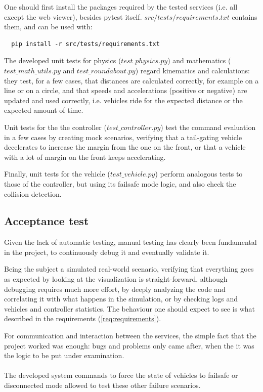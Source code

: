 One should first install the packages required by the tested services (i.e. all
except the web viewer), besides pytest itself. $src/tests/requirements.txt$
contains them, and can be used with:
\begin{verbatim}
  pip install -r src/tests/requirements.txt
\end{verbatim}

The developed unit tests for physics ($test\_physics.py$) and mathematics
($test\_math\_utils.py$ and $test\_roundabout.py$) regard kinematics and
calculations: they test, for a few cases, that distances are calculated
correctly, for example on a line or on a circle, and that speeds and
accelerations (positive or negative) are updated and used correctly, i.e.
vehicles ride for the expected distance or the expected amount of time.

Unit tests for the the controller ($test\_controller.py$) test the command
evaluation in a few cases by creating mock scenarios, verifying that a
tail-gating vehicle decelerates to increase the margin from the one on the
front, or that a vehicle with a lot of margin on the front keeps accelerating.

Finally, unit tests for the vehicle ($test\_vehicle.py$) perform analogous tests
to those of the controller, but using its failsafe mode logic, and also check
the collision detection.

\subsection{Acceptance test}\label{validation-acceptance}

Given the lack of automatic testing, manual testing has clearly been fundamental
in the project, to continuously debug it and eventually validate it.

Being the subject a simulated real-world scenario, verifying that everything
goes as expected by looking at the visualization is straight-forward, although
debugging requires much more effort, by deeply analyzing the code and
correlating it with what happens in the simulation, or by checking logs and
vehicles and controller statistics. The behaviour one should expect to see is
what described in the requirements (\ref{req:requirements}).

For communication and interaction between the services, the simple fact that the
project worked was enough: bugs and problems only came after, when the it was
the logic to be put under examination.
\\
\\
The developed system commands to force the state of vehicles to failsafe or
disconnected mode allowed to test these other failure scenarios.

